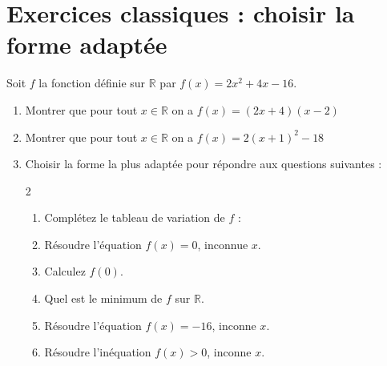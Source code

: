 \documentclass[main.tex]{subfiles}
\begin{document}
\section{Exercices classiques : choisir la forme adaptée}
\begin{exercise} Soit $f$ la fonction définie sur $\mathbb{R}$ par $f(x)=2x^2+4x-16$.
	\begin{enumerate}[leftmargin=*,label=\arabic*)]
		\item Montrer que pour tout $x\in\mathbb{R}$ on a $f(x)=(2x+4)(x-2)$
		\item Montrer que pour tout $x\in\mathbb{R}$ on a $f(x)=2(x+1)^2-18$
		\item Choisir la forme la plus adaptée pour répondre aux questions suivantes :
		\vspace{-1em}
\begin{multicols}{2}
	\begin{enumerate}[leftmargin=*,label=\alph*)]
			\item Complétez le tableau de variation de $f$ : \\
			\hfill
			\item Résoudre l'équation $f(x)=0$, inconnue $x$.
			\item Calculez $f(0)$.
			\item Quel est le minimum de $f$ sur $\mathbb{R}$.
			\item Résoudre l'équation $f(x)=-16$, inconne $x$.
			\item Résoudre l'inéquation $f(x)>0$, inconne $x$.
		\end{enumerate}
	\end{multicols}
	\end{enumerate} 
\end{exercise}
\end{document}
